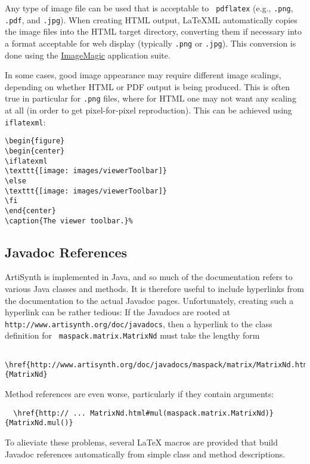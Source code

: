 \documentclass{article}
\begin{document}
Any type of image file can be used that is acceptable to {\tt
pdflatex} (e.g., {\tt .png}, {\tt .pdf}, and {\tt .jpg}). When creating
HTML output, LaTeXML automatically copies the image files into the
HTML target directory, converting them if necessary into a format
acceptable for web display (typically {\tt .png} or {\tt .jpg}). This
conversion is done using the
\href{http://www.imagemagick.org}{ImageMagic} application suite.

In some cases, good image appearance may require different image
scalings, depending on whether HTML or PDF output is being
produced. This is often true in particular for {\tt .png} files, where
for HTML one may not want any scaling at all (in order to get
pixel-for-pixel reproduction). This can be achieved using
{\tt \BKS iflatexml}:

\begin{lstlisting}
\begin{figure}
\begin{center}
\iflatexml
\texttt{[image: images/viewerToolbar]}
\else
\texttt{[image: images/viewerToolbar]}
\fi
\end{center}
\caption{The viewer toolbar.}%
\end{lstlisting}

\subsection{Javadoc References}
\label{JavadocRefsSec}

ArtiSynth is implemented in Java, and so much of the documentation
refers to various Java classes and methods. It is therefore useful to
include hyperlinks from the documentation to the actual Javadoc pages.
Unfortunately, creating such a hyperlink can be rather tedious: If the
Javadocs are rooted at {\tt http://www.artisynth.org/doc/javadocs},
then a hyperlink to the class definition for {\tt
maspack.matrix.MatrixNd} must take the lengthy form
\begin{verbatim}
  \href{http://www.artisynth.org/doc/javadocs/maspack/matrix/MatrixNd.html}{MatrixNd}
\end{verbatim}
Method references are even worse, particularly if they contain arguments:
\begin{verbatim}
  \href{http:// ... MatrixNd.html#mul(maspack.matrix.MatrixNd)}{MatrixNd.mul()}
\end{verbatim}
To alieviate these problems, several LaTeX macros are provided that
build Javadoc references automatically from simple class and
method descriptions.
\end{document}
